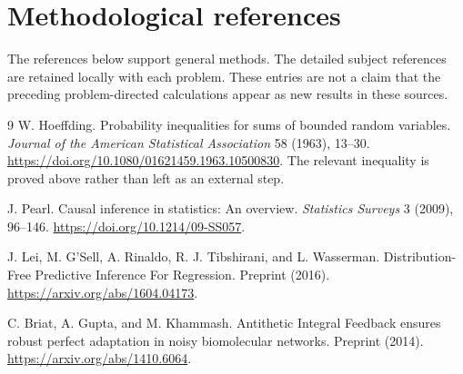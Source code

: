 \documentclass[11pt]{article}
\begin{document}
\section{Methodological references}
The references below support general methods. The detailed subject references
are retained locally with each problem. These entries are not a claim that the
preceding problem-directed calculations appear as new results in these sources.
\begin{thebibliography}{9}
W. Hoeffding. Probability inequalities for sums of bounded random variables.
\emph{Journal of the American Statistical Association} 58 (1963), 13--30.
\url{https://doi.org/10.1080/01621459.1963.10500830}.
The relevant inequality is proved above rather than left as an external step.

J. Pearl. Causal inference in statistics: An overview.
\emph{Statistics Surveys} 3 (2009), 96--146.
\url{https://doi.org/10.1214/09-SS057}.

J. Lei, M. G'Sell, A. Rinaldo, R. J. Tibshirani, and L. Wasserman.
Distribution-Free Predictive Inference For Regression. Preprint (2016).
\url{https://arxiv.org/abs/1604.04173}.

C. Briat, A. Gupta, and M. Khammash.
Antithetic Integral Feedback ensures robust perfect adaptation in noisy
biomolecular networks. Preprint (2014).
\url{https://arxiv.org/abs/1410.6064}.
\end{thebibliography}
\end{document}
